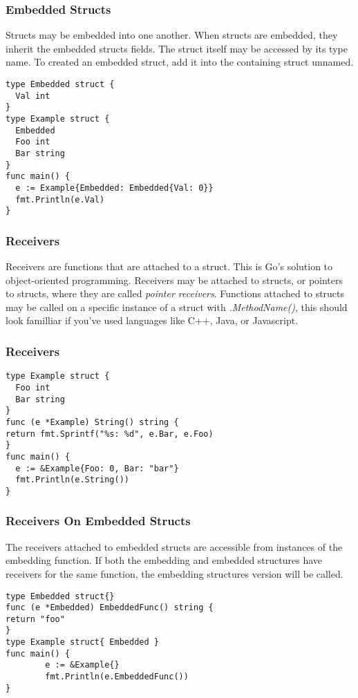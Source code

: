 \documentclass{beamer}
\begin{document}
\begin{frame}[fragile]
  \frametitle{Embedded Structs}
  Structs may be embedded into one another.  When structs are
  embedded, they inherit the embedded structs fields.  The struct
  itself may be accessed by its type name.  To created an embedded
  struct, add it into the containing struct unnamed.
\begin{lstlisting}[language=Golang]
type Embedded struct {
  Val int
}
type Example struct {
  Embedded
  Foo int
  Bar string
}
func main() {
  e := Example{Embedded: Embedded{Val: 0}}
  fmt.Println(e.Val)
}
\end{lstlisting}
\end{frame}

\begin{frame}
  \frametitle{Receivers}
  Receivers are functions that are attached to a struct.  This is Go's
  solution to object-oriented programming.  Receivers may be attached
  to structs, or pointers to structs, where they are called
  \emph{pointer receivers}.  Functions attached to structs may be
  called on a specific instance of a struct with \emph{.MethodName()},
  this should look familliar if you've used languages like C++, Java,
  or Javascript.
\end{frame}

\begin{frame}[fragile]
  \frametitle{Receivers}
\begin{lstlisting}[language=Golang]
type Example struct {
  Foo int
  Bar string
}
func (e *Example) String() string {
return fmt.Sprintf("%s: %d", e.Bar, e.Foo)
}
func main() {
  e := &Example{Foo: 0, Bar: "bar"}
  fmt.Println(e.String())
}
\end{lstlisting}
\end{frame}

\begin{frame}[fragile]
  \frametitle{Receivers On Embedded Structs}
  The receivers attached to embedded structs are accessible from
  instances of the embedding function.  If both the embedding and
  embedded structures have receivers for the same function, the
  embedding structures version will be called.
\begin{lstlisting}[language=Golang]
type Embedded struct{}
func (e *Embedded) EmbeddedFunc() string {
return "foo"
}
type Example struct{ Embedded }
func main() {
        e := &Example{}
        fmt.Println(e.EmbeddedFunc())
}
\end{lstlisting}
\end{frame}
\end{document}
